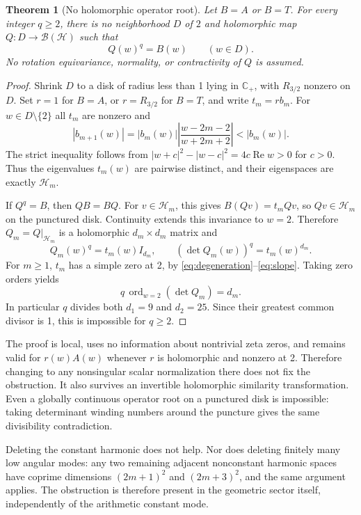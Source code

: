 \documentclass[11pt,letterpaper]{article}
\newtheorem{theorem}{Theorem}
\newcommand{\HH}{\mathcal H}
\newcommand{\BB}{\mathcal B}
\newcommand{\CP}{\mathbb C_+}
\newcommand{\Rea}{\operatorname{Re}}
\newcommand{\ord}{\operatorname{ord}}
\begin{document}
\begin{theorem}[No holomorphic operator root]\label{thm:root}
Let $B=A$ or $B=T$. For every integer $q\geq2$, there is no neighborhood $D$ of $2$ and holomorphic map $Q:D\to\BB(\HH)$ such that
\[
 Q(w)^q=B(w)\qquad(w\in D).
\]
No rotation equivariance, normality, or contractivity of $Q$ is assumed.
\end{theorem}
\begin{proof}
Shrink $D$ to a disk of radius less than 1 lying in $\CP$, with $R_{3/2}$ nonzero on $D$. Set $r=1$ for $B=A$, or $r=R_{3/2}$ for $B=T$, and write $t_m=rb_m$. For $w\in D\setminus\{2\}$ all $t_m$ are nonzero and
\[
 |b_{m+1}(w)|=|b_m(w)|\left|\frac{w-2m-2}{w+2m+2}\right|<|b_m(w)|.
\]
The strict inequality follows from
$|w+c|^2-|w-c|^2=4c\Rea w>0$ for $c>0$. Thus the eigenvalues $t_m(w)$ are pairwise distinct, and their eigenspaces are exactly $\HH_m$.

If $Q^q=B$, then $QB=BQ$. For $v\in\HH_m$, this gives $B(Qv)=t_mQv$, so $Qv\in\HH_m$ on the punctured disk. Continuity extends this invariance to $w=2$. Therefore $Q_m=Q|_{\HH_m}$ is a holomorphic $d_m\times d_m$ matrix and
\[
 Q_m(w)^q=t_m(w)I_{d_m},\qquad (\det Q_m(w))^q=t_m(w)^{d_m}.
\]
For $m\geq1$, $t_m$ has a simple zero at 2, by \eqref{eq:degeneration}--\eqref{eq:slope}. Taking zero orders yields
\[
 q\,\ord_{w=2}(\det Q_m)=d_m.
\]
In particular $q$ divides both $d_1=9$ and $d_2=25$. Since their greatest common divisor is 1, this is impossible for $q\geq2$.
\end{proof}

The proof is local, uses no information about nontrivial zeta zeros, and remains valid for $r(w)A(w)$ whenever $r$ is holomorphic and nonzero at 2. Therefore changing to any nonsingular scalar normalization there does not fix the obstruction. It also survives an invertible holomorphic similarity transformation. Even a globally continuous operator root on a punctured disk is impossible: taking determinant winding numbers around the puncture gives the same divisibility contradiction.

Deleting the constant harmonic does not help. Nor does deleting finitely many low angular modes: any two remaining adjacent nonconstant harmonic spaces have coprime dimensions $(2m+1)^2$ and $(2m+3)^2$, and the same argument applies. The obstruction is therefore present in the geometric sector itself, independently of the arithmetic constant mode.
\end{document}
